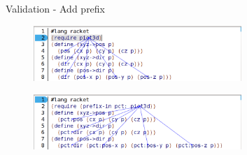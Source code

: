 \documentclass[xcolor=dvipsnames]{beamer}
\begin{document}
\begin{frame}{Validation - Add prefix}
\begin{figure}[htbp]
  \centering
  \includegraphics[width=0.7\textwidth]{img/add-prefixV2-1.png}
  \label{fig:AddPrefixBefore}
\end{figure}
\begin{figure}[htbp]
  \centering
  \includegraphics[width=0.7\textwidth]{img/add-prefixV2-3.png}
  \label{fig:AddPrefixAfter}
\end{figure}
\end{frame}
\end{document}
